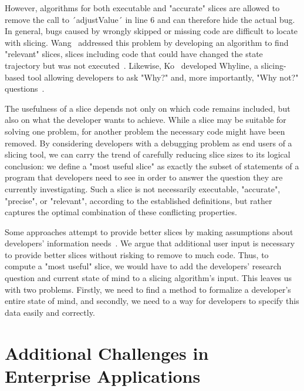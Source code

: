 However, algorithms for both executable and "accurate" slices are allowed to remove the call to ´adjustValue´ in line 6 and can therefore hide the actual bug.
In general, bugs caused by wrongly skipped or missing code are difficult to locate with slicing.
Wang \etal\ addressed this problem by developing an algorithm to find "relevant" slices, slices including code that could have changed the state trajectory but was not executed~\cite{wang08:dynamic_slicing_on_java}.
Likewise, Ko \etal\ developed Whyline, a slicing-based tool allowing developers to ask "Why?" and, more importantly, "Why not?" questions~\cite{ko08:debugging_reinvented_asking}.

The usefulness of a slice depends not only on which code remains included, but also on what the developer wants to achieve.
While a slice may be suitable for solving one problem, for another problem the necessary code might have been removed.
By considering developers with a debugging problem as end users of a slicing tool, we can carry the trend of carefully reducing slice sizes to its logical conclusion: we define a "most useful slice" as exactly the subset of statements of a program that developers need to see in order to answer the question they are currently investigating.
Such a slice is not necessarily executable, "accurate", "precise", or "relevant", according to the established definitions, but rather captures the optimal combination of these conflicting properties.

Some approaches attempt to provide better slices by making assumptions about developers' information needs~\cite{sridharan07:thin_slicing}.
We argue that additional user input is necessary to provide better slices without risking to remove to much code.
Thus, to compute a "most useful" slice, we would have to add the developers' research question and current state of mind to a slicing algorithm's input.
This leaves us with two problems.
Firstly, we need to find a method to formalize a developer's entire state of mind, and secondly, we need to a way for developers to specify this data easily and correctly.


\section{Additional Challenges in Enterprise Applications}
\label{sec:enterprise_applications}

